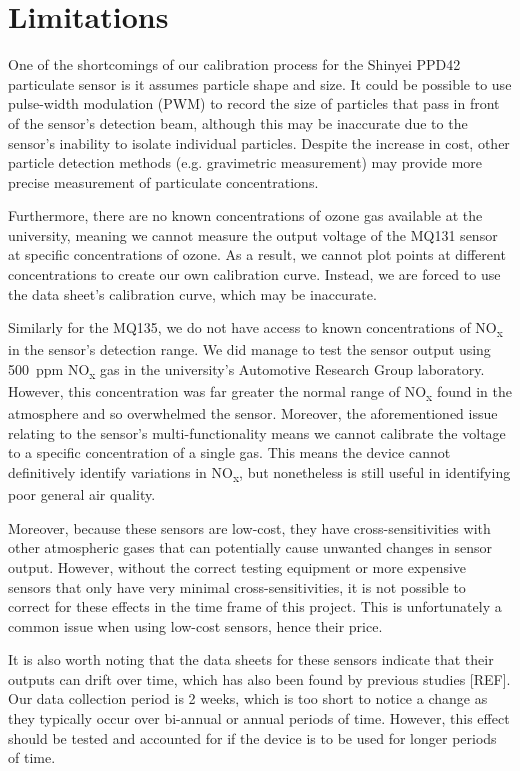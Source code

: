 \documentclass[11pt,twosided,a4paper]{report}
\begin{document}
\section{Limitations}

One of the shortcomings of our calibration process for the Shinyei PPD42 particulate sensor is it assumes particle shape and size. It could be possible to use pulse-width modulation (PWM) to record the size of particles that pass in front of the sensor's detection beam, although this may be inaccurate due to the sensor's inability to isolate individual particles. Despite the increase in cost, other particle detection methods (e.g. gravimetric measurement) may provide more precise measurement of particulate concentrations.

Furthermore, there are no known concentrations of ozone gas available at the university, meaning we cannot measure the output voltage of the MQ131 sensor at specific concentrations of ozone. As a result, we cannot plot points at different concentrations to create our own calibration curve. Instead, we are forced to use the data sheet's calibration curve, which may be inaccurate.

Similarly for the MQ135, we do not have access to known concentrations of NO\textsubscript{x} in the sensor's detection range. We did manage to test the sensor output using 500~ppm NO\textsubscript{x} gas in the university's Automotive Research Group laboratory. However, this concentration was far greater the normal range of NO\textsubscript{x} found in the atmosphere and so overwhelmed the sensor. Moreover, the aforementioned issue relating to the sensor's multi-functionality means we cannot calibrate the voltage to a specific concentration of a single gas. This means the device cannot definitively identify variations in NO\textsubscript{x}, but nonetheless is still useful in identifying poor general air quality.


Moreover, because these sensors are low-cost, they have cross-sensitivities with other atmospheric gases that can potentially cause unwanted changes in sensor output. However, without the correct testing equipment or more expensive sensors that only have very minimal cross-sensitivities, it is not possible to correct for these effects in the time frame of this project. This is unfortunately a common issue when using low-cost sensors, hence their price.

It is also worth noting that the data sheets for these sensors indicate that their outputs can drift over time, which has also been found by previous studies [REF]. Our data collection period is 2 weeks, which is too short to notice a change as they typically occur over bi-annual or annual periods of time. However, this effect should be tested and accounted for if the device is to be used for longer periods of time.
\end{document}
